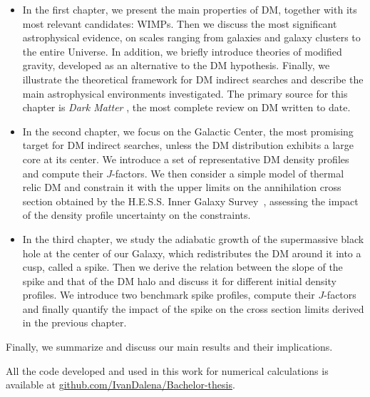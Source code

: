 \begin{itemize}
    
    \item In the first chapter, we present the main properties of DM, together with its most relevant candidates: WIMPs. Then we discuss the most significant astrophysical evidence, on scales ranging from galaxies and galaxy clusters to the entire Universe. In addition, we briefly introduce theories of modified gravity, developed as an alternative to the DM hypothesis. Finally, we illustrate the theoretical framework for DM indirect searches and describe the main astrophysical environments investigated.
          The primary source for this chapter is \emph{Dark Matter} \cite{cirelli2025darkmatter}, the most complete review on DM written to date.
    
    \item In the second chapter, we focus on the Galactic Center, the most promising target for DM indirect searches, unless the DM distribution exhibits a large core at its center.
          We introduce a set of representative DM density profiles and compute their $J$-factors.
          We then consider a simple model of thermal relic DM and constrain it with the upper limits on the annihilation cross section obtained by the H.E.S.S. Inner Galaxy Survey~\cite{Abdalla_2022}, assessing the impact of the density profile uncertainty on the constraints.
    
    \item In the third chapter, we study the adiabatic growth of the supermassive black hole at the center of our Galaxy, which redistributes the DM around it into a cusp, called a spike.
          Then we derive the relation between the slope of the spike and that of the DM halo and discuss it for different initial density profiles.
          We introduce two benchmark spike profiles, compute their $J$-factors and finally quantify the impact of the spike on the cross section limits derived in the previous chapter.
     
\end{itemize}


Finally, we summarize and discuss our main results and their implications.

All the code developed and used in this work for numerical calculations is available at \href{https://github.com/IvanDalena/Bachelor-thesis}{\textcolor{githublink}{github.com/IvanDalena/Bachelor-thesis}}.